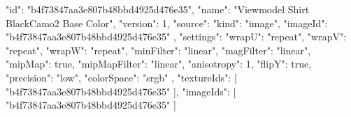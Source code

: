 {
  "id": "b4f73847aa3e807b48bbd4925d476e35",
  "name": "Viewmodel Shirt BlackCamo2 Base Color",
  "version": 1,
  "source": {
    "kind": "image",
    "imageId": "b4f73847aa3e807b48bbd4925d476e35"
  },
  "settings": {
    "wrapU": "repeat",
    "wrapV": "repeat",
    "wrapW": "repeat",
    "minFilter": "linear",
    "magFilter": "linear",
    "mipMap": true,
    "mipMapFilter": "linear",
    "anisotropy": 1,
    "flipY": true,
    "precision": "low",
    "colorSpace": "srgb"
  },
  "textureIds": [
    "b4f73847aa3e807b48bbd4925d476e35"
  ],
  "imageIds": [
    "b4f73847aa3e807b48bbd4925d476e35"
  ]
}
